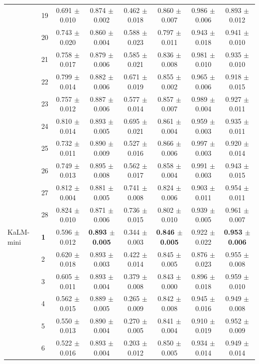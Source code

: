 \begin{longtable}{llcccccc}
 & 19 & 0.691 $\pm$ 0.010 & 0.874 $\pm$ 0.002 & 0.462 $\pm$ 0.018 & 0.860 $\pm$ 0.007 & 0.986 $\pm$ 0.006 & 0.893 $\pm$ 0.012 \\
 & 20 & 0.743 $\pm$ 0.020 & 0.860 $\pm$ 0.004 & 0.588 $\pm$ 0.023 & 0.797 $\pm$ 0.011 & 0.943 $\pm$ 0.018 & 0.941 $\pm$ 0.010 \\
 & 21 & 0.758 $\pm$ 0.017 & 0.879 $\pm$ 0.006 & 0.585 $\pm$ 0.021 & 0.836 $\pm$ 0.008 & 0.981 $\pm$ 0.010 & 0.935 $\pm$ 0.010 \\
 & 22 & 0.799 $\pm$ 0.014 & 0.882 $\pm$ 0.006 & 0.671 $\pm$ 0.019 & 0.855 $\pm$ 0.002 & 0.965 $\pm$ 0.006 & 0.918 $\pm$ 0.015 \\
 & 23 & 0.757 $\pm$ 0.012 & 0.887 $\pm$ 0.006 & 0.577 $\pm$ 0.014 & 0.857 $\pm$ 0.007 & 0.989 $\pm$ 0.004 & 0.927 $\pm$ 0.011 \\
 & 24 & 0.810 $\pm$ 0.014 & 0.893 $\pm$ 0.005 & 0.695 $\pm$ 0.021 & 0.861 $\pm$ 0.004 & 0.959 $\pm$ 0.003 & 0.935 $\pm$ 0.011 \\
 & 25 & 0.732 $\pm$ 0.011 & 0.890 $\pm$ 0.009 & 0.527 $\pm$ 0.016 & 0.866 $\pm$ 0.006 & 0.997 $\pm$ 0.003 & 0.920 $\pm$ 0.014 \\
 & 26 & 0.749 $\pm$ 0.013 & 0.895 $\pm$ 0.008 & 0.562 $\pm$ 0.017 & 0.858 $\pm$ 0.004 & 0.991 $\pm$ 0.003 & 0.943 $\pm$ 0.015 \\
 & 27 & 0.812 $\pm$ 0.004 & 0.881 $\pm$ 0.005 & 0.741 $\pm$ 0.008 & 0.824 $\pm$ 0.006 & 0.903 $\pm$ 0.011 & 0.954 $\pm$ 0.011 \\
 & 28 & 0.824 $\pm$ 0.010 & 0.871 $\pm$ 0.006 & 0.736 $\pm$ 0.015 & 0.802 $\pm$ 0.010 & 0.939 $\pm$ 0.005 & 0.961 $\pm$ 0.007 \\
\midrule
KaLM-mini & \textbf{1} & 0.596 $\pm$ 0.012 & \textbf{0.893 $\pm$ 0.005} & 0.344 $\pm$ 0.003 & \textbf{0.846 $\pm$ 0.005} & 0.922 $\pm$ 0.022 & \textbf{0.953 $\pm$ 0.006} \\
 & 2 & 0.620 $\pm$ 0.018 & 0.893 $\pm$ 0.003 & 0.422 $\pm$ 0.014 & 0.845 $\pm$ 0.005 & 0.876 $\pm$ 0.023 & 0.955 $\pm$ 0.008 \\
 & 3 & 0.605 $\pm$ 0.011 & 0.893 $\pm$ 0.004 & 0.379 $\pm$ 0.008 & 0.843 $\pm$ 0.000 & 0.896 $\pm$ 0.018 & 0.959 $\pm$ 0.010 \\
 & 4 & 0.562 $\pm$ 0.015 & 0.889 $\pm$ 0.005 & 0.265 $\pm$ 0.009 & 0.842 $\pm$ 0.008 & 0.945 $\pm$ 0.016 & 0.949 $\pm$ 0.008 \\
 & 5 & 0.550 $\pm$ 0.013 & 0.890 $\pm$ 0.004 & 0.270 $\pm$ 0.005 & 0.841 $\pm$ 0.004 & 0.910 $\pm$ 0.019 & 0.952 $\pm$ 0.009 \\
 & 6 & 0.522 $\pm$ 0.016 & 0.893 $\pm$ 0.004 & 0.203 $\pm$ 0.012 & 0.850 $\pm$ 0.005 & 0.934 $\pm$ 0.014 & 0.949 $\pm$ 0.014 \\

\end{longtable}
